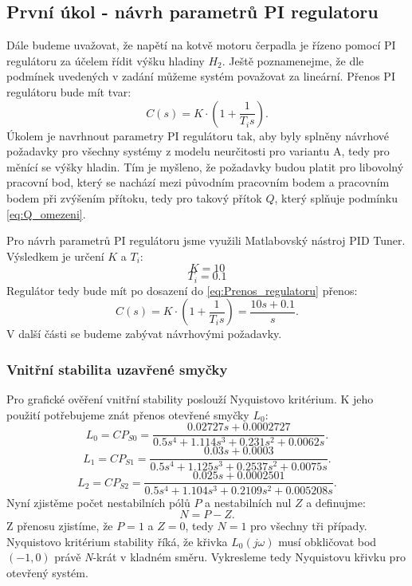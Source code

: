 \documentclass[a4paper,11pt]{article}
\begin{document}
\subsection{První úkol - návrh parametrů PI regulatoru}\label{sec:PI} 
Dále budeme uvažovat, že napětí na kotvě motoru čerpadla je řízeno pomocí PI regulátoru za účelem řídit výšku hladiny $ H_{2} $. Ještě poznamenejme, že  dle podmínek uvedených v zadání můžeme systém považovat za lineární. Přenos PI regulátoru bude mít tvar:
\begin{equation}\label{eq:Prenos_regulatoru} 
C\left ( s \right )=K\cdot \left ( 1+\frac{1}{T_{i}s} \right ).
\end{equation}
Úkolem je navrhnout parametry PI regulátoru tak, aby byly splněny návrhové požadavky pro všechny systémy z modelu neurčitosti pro variantu A, tedy pro měnící se výšky hladin. Tím je myšleno, že požadavky budou platit pro libovolný pracovní bod, který se nachází mezi původním pracovním bodem a pracovním bodem při zvýšením přítoku, tedy pro takový přítok $ Q $, který splňuje podmínku \ref{eq:Q_omezeni}. 

Pro návrh parametrů PI regulátoru jsme využili Matlabovský nástroj PID Tuner. Výsledkem je určení $ K $ a $ T_{i} $:
$$ K = 10 $$ 
$$ T_{i} = 0.1 $$
Regulátor tedy bude mít po dosazení do \ref{eq:Prenos_regulatoru} přenos:
\begin{equation}\label{eq:Vypocteny_prenos_regulatoru} 
C\left ( s \right )=K\cdot \left ( 1+\frac{1}{T_{i}s} \right ) = \frac{10s+0.1}{s}.
\end{equation}
V další části se budeme zabývat návrhovými požadavky.

\newpage
\subsubsection{Vnitřní stabilita uzavřené smyčky}
Pro grafické ověření vnitřní stability poslouží Nyquistovo kritérium. K jeho použití potřebujeme znát přenos otevřené smyčky $ L_{0} $:
\begin{equation}\label{eq:L0} 
L_{0}=CP_{S0}=\frac{ 0.02727 s + 0.0002727}{0.5 s^{4} + 1.114 s^3 + 0.231 s^2 + 0.0062 s}.
\end{equation}
\begin{equation}\label{eq:Lmin} 
L_{1}=CP_{S1}=\frac{0.03 s + 0.0003}{0.5 s^4 + 1.125 s^3 + 0.2537 s^2 + 0.0075 s}.
\end{equation}
\begin{equation}\label{eq:Lmax} 
L_{2}=CP_{S2}=\frac{0.025 s + 0.0002501}{0.5 s^4 + 1.104 s^3 + 0.2109 s^2 + 0.005208 s}.
\end{equation}
Nyní zjistěme počet nestabilních pólů $ P $ a nestabilních nul $ Z $ a definujme:
\begin{equation}\label{eq:N=P-Z} 
N=P-Z.
\end{equation}
Z přenosu zjistíme, že $ P=1 $ a $ Z=0 $, tedy $ N=1 $ pro všechny tři případy. Nyquistovo kritérium stability říká, že křivka $ L_{0}\left ( j\omega \right )  $ musí obkličovat bod $ \left ( -1,0 \right ) $ právě \textit{N}-krát v kladném směru. Vykresleme tedy Nyquistovu křivku pro otevřený systém.
\end{document}
